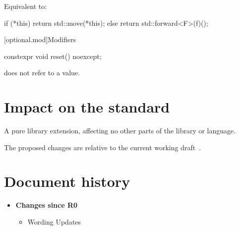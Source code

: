 \documentclass[a4paper,10pt,oneside,openany,final,article]{memoir}
\begin{document}
\begin{wording}
\begin{itemdescr}
    \pnum
    \effects
    Equivalent to:
    \begin{codeblock}
      if (*this) {
        return std::move(*this);
      } else {
        return std::forward<F>(f)();
      }
    \end{codeblock}
  \end{itemdescr}

  [optional.mod]{Modifiers}

  \begin{itemdecl}
    constexpr void reset() noexcept;
  \end{itemdecl}

  \begin{itemdescr}

    \pnum
    \ensures
     does not refer to a value.
  \end{itemdescr}



\end{wording}

\chapter{Impact on the standard}

A pure library extension, affecting no other parts of the library or language.

The proposed changes are relative to the current working draft~\cite{N4910}.

\chapter*{Document history}

\begin{itemize}
\item \textbf{Changes since R0}
  \begin{itemize}
  \item Wording Updates
  \end{itemize}
\end{itemize}

\renewcommand{\bibname}{References}


\end{document}
